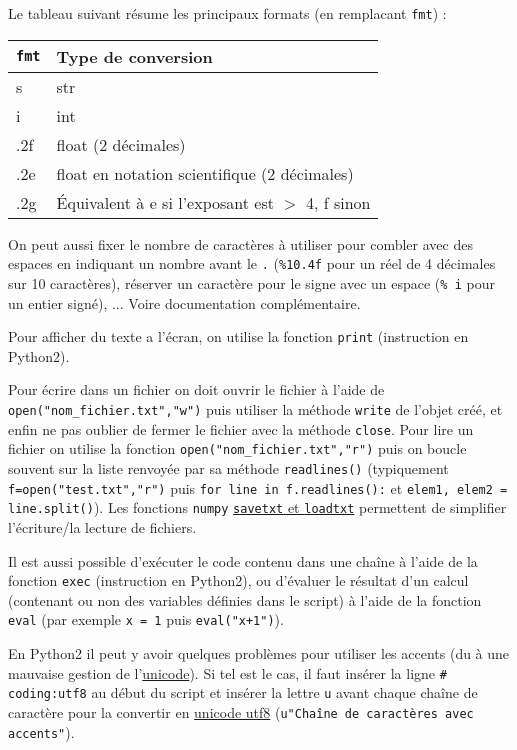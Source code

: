 \documentclass{article}
\begin{document}
Le tableau suivant résume les principaux formats (en remplacant \texttt{fmt}) :

\begin{tabular}{|l|l|}
    \hline
    \texttt{fmt}    & Type de conversion\\
    \hline
    s               & str\\
    i               & int\\
    .2f             & float (2 décimales)\\
    .2e             & float en notation scientifique (2 décimales)\\
    .2g             & Équivalent à e si l'exposant est $>$ 4, f sinon\\
    \hline
\end{tabular}

On peut aussi fixer le nombre de caractères à utiliser pour combler avec des espaces en indiquant un nombre avant le \texttt{.} (\texttt{\%10.4f} pour un réel de 4 décimales sur 10 caractères), réserver un caractère pour le signe avec un espace (\texttt{\% i} pour un entier signé), ... Voire documentation complémentaire.

Pour afficher du texte a l'écran, on utilise la fonction \texttt{print} (instruction en Python2).

Pour écrire dans un fichier on doit ouvrir le fichier à l'aide de \texttt{open("nom\_fichier.txt","w")} puis utiliser la méthode \texttt{write} de l'objet créé, et enfin ne pas oublier de fermer le fichier avec la méthode \texttt{close}. Pour lire un fichier on utilise la fonction \texttt{open("nom\_fichier.txt","r")} puis on boucle souvent sur la liste renvoyée par sa méthode \texttt{readlines()} (typiquement \texttt{f=open("test.txt","r")} puis \texttt{for line in f.readlines():} et \texttt{elem1, elem2 = line.split()}). Les fonctions \texttt{numpy} \href{}{\texttt{savetxt} et \texttt{loadtxt}} permettent de simplifier l'écriture/la lecture de fichiers.

Il est aussi possible d'exécuter le code contenu dans une chaîne à l'aide de la fonction \texttt{exec} (instruction en Python2), ou d'évaluer le résultat d'un calcul (contenant ou non des variables définies dans le script) à l'aide de la fonction \texttt{eval} (par exemple \texttt{x = 1} puis \texttt{eval("x+1")}).

En Python2 il peut y avoir quelques problèmes pour utiliser les accents (du à une mauvaise gestion de l'\href{https://fr.wikipedia.org/wiki/Unicode}{unicode}). Si tel est le cas, il faut insérer la ligne \texttt{\# coding:utf8} au début du script et insérer la lettre \texttt{u} avant chaque chaîne de caractère pour la convertir en \href{https://fr.wikipedia.org/wiki/UTF-8}{unicode utf8} (\texttt{u"Chaîne de caractères avec accents"}).
\end{document}

